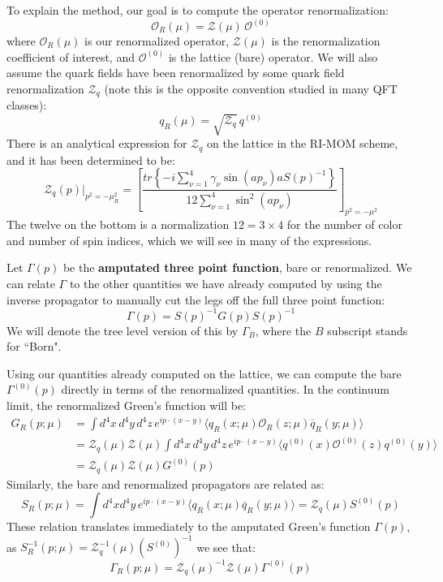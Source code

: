 \documentclass[11pt, oneside]{article}   	%
\theoremstyle{definition}
\begin{document}
To explain the method, our goal is to compute the operator renormalization:
\begin{equation}
	\mathcal O_R(\mu) = \mathcal Z(\mu) \,\mathcal O^{(0)}
\end{equation}
where $\mathcal O_R(\mu)$ is our renormalized operator, $\mathcal Z(\mu)$ is the renormalization coefficient of 
interest, and $\mathcal O^{(0)}$ is the lattice (bare) operator. We will also assume the quark fields have been 
renormalized by some quark field renormalization $\mathcal Z_q$ (note this is the opposite convention studied in 
many QFT classes):
\begin{equation}
	q_R(\mu) = \sqrt{\mathcal Z_q}\,q^{(0)}
\end{equation}
There is an analytical expression for $\mathcal{Z}_q$ on the lattice in the RI-MOM scheme, and it has been determined 
to be:
\begin{equation}
	\mathcal Z_q(p)|_{p^2 = -\mu_R^2} = \left[\frac{tr\left\{-i\sum_{\nu = 1}^4 \gamma_\nu \sin(ap_\nu) a S(p)^{-1}\right\}}{12\sum_{\nu = 1}^4 \sin^2(ap_\nu)}\right]_{p^2 = -\mu^2}
\end{equation}
The twelve on the bottom is a normalization $12 = 3\times 4$ for the number of color and number of spin indices, which we will 
see in many of the expressions. 

Let $\Gamma(p)$ be the \textbf{amputated three point function}, bare or renormalized. We can relate $\Gamma$ to the other 
quantities we have already computed by using the inverse propagator to manually cut the legs off the full three 
point function:
\begin{equation}
	\Gamma(p) = S(p)^{-1} G(p) S(p)^{-1}
\end{equation}
We will denote the tree level version of this by $\Gamma_B$, where the $B$ subscript stands for ``Born". 

Using our quantities already computed on the lattice, we can compute the bare $\Gamma^{(0)}(p)$ directly in terms 
of the renormalized quantities. In the continuum limit, the renormalized Green's function will be:
\begin{align}
	G_R(p; \mu) &= \int d^4x \, d^4 y\, d^4 z\, e^{ip\cdot (x - y)} \langle q_R(x; \mu) \mathcal O_R(z; \mu) \overline 
	q_R(y; \mu) 
	\rangle \\
	&= \mathcal Z_q(\mu) \mathcal Z(\mu) \int d^4x \, d^4 y\, d^4 z\, e^{ip\cdot (x - y)} \langle q^{(0)}(x) \mathcal O^{(0)}
	(z) q^{(0)}(y) \rangle \\
	&= \mathcal Z_q(\mu) \mathcal Z(\mu) G^{(0)}(p)
\end{align}
Similarly, the bare and renormalized propagators are related as:
\begin{equation}
	S_R(p; \mu) = \int d^4x d^4 y\, e^{ip\cdot(x - y)}\langle q_R(x; \mu)\overline q_R(y; \mu)\rangle = \mathcal Z_q(\mu) 
	S^{(0)}(p)
\end{equation}
These relation translates immediately to the amputated Green's function $\Gamma(p)$, as $S^{-1}_R(p; \mu) = \mathcal 
Z_q^{-1}(\mu) (S^{(0)})^{-1}$ we see that:
\begin{equation}
	\Gamma_R(p; \mu) = \mathcal Z_q(\mu)^{-1}\mathcal Z(\mu) \Gamma^{(0)}(p)
\end{equation}
\end{document}

